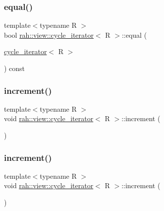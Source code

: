 \subsubsection{\texorpdfstring{equal()}{equal()}\hspace{0.1cm}{\footnotesize\ttfamily [2/2]}}
{\footnotesize\ttfamily template$<$typename R $>$ \\
bool \mbox{\hyperlink{structrah_1_1view_1_1cycle__iterator}{rah\+::view\+::cycle\+\_\+iterator}}$<$ R $>$\+::equal (\begin{DoxyParamCaption}\item[{\mbox{\hyperlink{structrah_1_1view_1_1cycle__iterator}{cycle\+\_\+iterator}}$<$ R $>$}]{ }\end{DoxyParamCaption}) const\hspace{0.3cm}{\ttfamily [inline]}}

\mbox{\label{structrah_1_1view_1_1cycle__iterator_afa27786b512afe924d063245d7bdc3ea}} 
\subsubsection{\texorpdfstring{increment()}{increment()}\hspace{0.1cm}{\footnotesize\ttfamily [1/2]}}
{\footnotesize\ttfamily template$<$typename R $>$ \\
void \mbox{\hyperlink{structrah_1_1view_1_1cycle__iterator}{rah\+::view\+::cycle\+\_\+iterator}}$<$ R $>$\+::increment (\begin{DoxyParamCaption}{ }\end{DoxyParamCaption})\hspace{0.3cm}{\ttfamily [inline]}}

\mbox{\label{structrah_1_1view_1_1cycle__iterator_afa27786b512afe924d063245d7bdc3ea}} 
\subsubsection{\texorpdfstring{increment()}{increment()}\hspace{0.1cm}{\footnotesize\ttfamily [2/2]}}
{\footnotesize\ttfamily template$<$typename R $>$ \\
void \mbox{\hyperlink{structrah_1_1view_1_1cycle__iterator}{rah\+::view\+::cycle\+\_\+iterator}}$<$ R $>$\+::increment (\begin{DoxyParamCaption}{ }\end{DoxyParamCaption})\hspace{0.3cm}{\ttfamily [inline]}}



